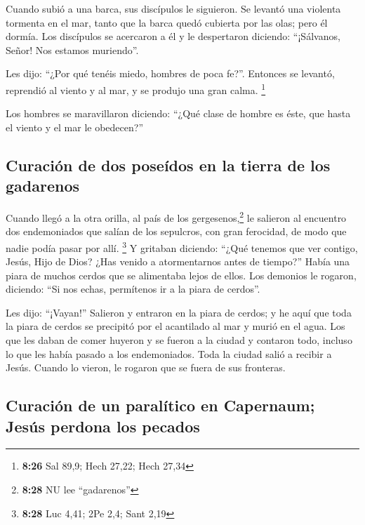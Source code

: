  Cuando subió a una barca, sus discípulos le siguieron.
 Se levantó una violenta tormenta en el mar, tanto que la
barca quedó cubierta por las olas; pero él dormía.  Los
discípulos se acercaron a él y le despertaron diciendo: ``¡Sálvanos,
Señor! Nos estamos muriendo''.

 Les dijo: ``¿Por qué tenéis miedo, hombres de poca
fe?''. Entonces se levantó, reprendió al viento y al mar, y se produjo
una gran calma. \footnote{\textbf{8:26} Sal 89,9; Hech 27,22; Hech 27,34}

 Los hombres se maravillaron diciendo: ``¿Qué clase de
hombre es éste, que hasta el viento y el mar le obedecen?''

\hypertarget{curaciuxf3n-de-dos-poseuxeddos-en-la-tierra-de-los-gadarenos}{%
\subsection{Curación de dos poseídos en la tierra de los
gadarenos}\label{curaciuxf3n-de-dos-poseuxeddos-en-la-tierra-de-los-gadarenos}}

 Cuando llegó a la otra orilla, al país de los
gergesenos,\footnote{\textbf{8:28} NU lee ``gadarenos''} le salieron al
encuentro dos endemoniados que salían de los sepulcros, con gran
ferocidad, de modo que nadie podía pasar por allí. \footnote{\textbf{8:28}
  Luc 4,41; 2Pe 2,4; Sant 2,19}  Y gritaban diciendo:
``¿Qué tenemos que ver contigo, Jesús, Hijo de Dios? ¿Has venido a
atormentarnos antes de tiempo?''  Había una piara de
muchos cerdos que se alimentaba lejos de ellos.  Los
demonios le rogaron, diciendo: ``Si nos echas, permítenos ir a la piara
de cerdos''.

 Les dijo: ``¡Vayan!'' Salieron y entraron en la piara de
cerdos; y he aquí que toda la piara de cerdos se precipitó por el
acantilado al mar y murió en el agua.  Los que les daban
de comer huyeron y se fueron a la ciudad y contaron todo, incluso lo que
les había pasado a los endemoniados.  Toda la ciudad
salió a recibir a Jesús. Cuando lo vieron, le rogaron que se fuera de
sus fronteras.

\hypertarget{curaciuxf3n-de-un-paraluxedtico-en-capernaum-jesuxfas-perdona-los-pecados}{%
\subsection{Curación de un paralítico en Capernaum; Jesús perdona los
pecados}\label{curaciuxf3n-de-un-paraluxedtico-en-capernaum-jesuxfas-perdona-los-pecados}}


